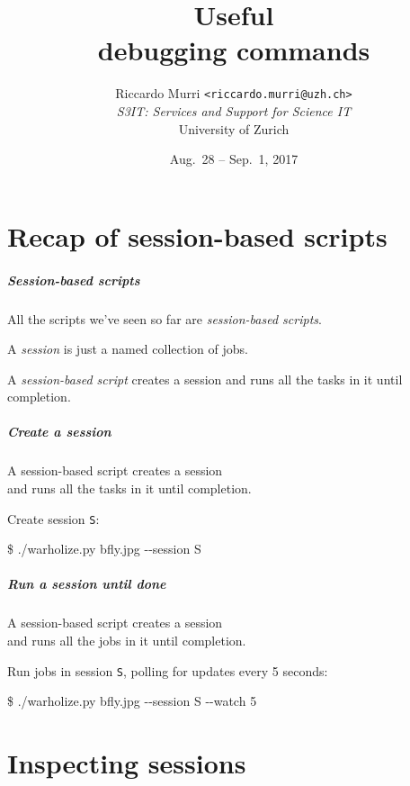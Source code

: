 \documentclass[english,serif,mathserif,xcolor=pdftex,dvipsnames,table]{beamer}
\title[Debugging commands]{%
  Useful \\ debugging commands
}
\author[R. Murri, S3IT UZH]{%
  Riccardo Murri \texttt{<riccardo.murri@uzh.ch>}
  \\[1ex]
  \emph{S3IT: Services and Support for Science IT}
  \\[1ex]
  University of Zurich
}
\date{Aug.~28 -- Sep.~1, 2017}
\begin{document}
\maketitle


\part{Recap of session-based scripts}


\begin{frame}
  \frametitle{Session-based scripts}

  All the scripts we've seen so far are \emph{session-based scripts}.

  \+ A \emph{session} is just a named collection of jobs.

  \+ A \emph{session-based script} creates a session and runs all the
  tasks in it until completion.
\end{frame}


\begin{frame}
  \frametitle{Create a session}

  A session-based script \alert{creates a session}
  \\
  and runs all the tasks in it until completion.

  \+ Create session \texttt{S}:
\begin{semiverbatim}
    \$ ./warholize.py bfly.jpg -{}-session S
\end{semiverbatim}
\end{frame}


\begin{frame}[fragile]
  \frametitle{Run a session until done}

  A session-based script creates a session
  \\
  and \alert<1>{runs all the jobs in it until completion.}

  \+ Run jobs in session \texttt{S},
  polling for updates every 5 seconds:
\begin{semiverbatim}\small
    \$ ./warholize.py bfly.jpg -{}-session S -{}-watch 5
\end{semiverbatim}

  \+ 
\end{frame}


\part{Inspecting sessions}
\end{document}
